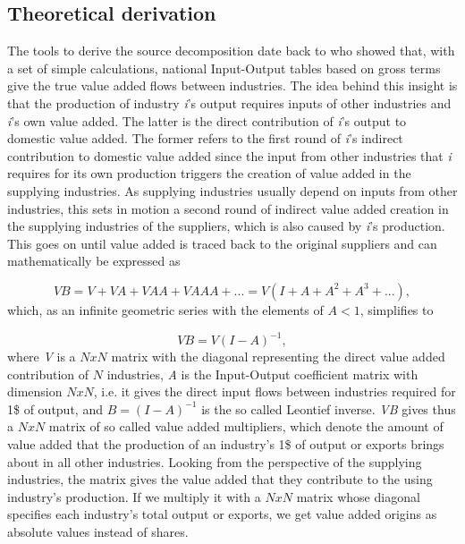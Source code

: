 \documentclass[a4paper]{article}\usepackage[]{graphicx}\usepackage[]{color}
\begin{document}
\subsection{Theoretical derivation}
The tools to derive the source decomposition date back to \citet{wale36} who showed that, with a set of simple calculations, 
national Input-Output tables based on gross terms give the true value added flows between industries. 
The idea behind this insight is that the production of industry \textit{i}'s output requires inputs of other industries 
and \textit{i}'s own value added.
The latter is the direct contribution of \textit{i}'s output to domestic value added. 
The former refers to the first round of \textit{i}'s indirect contribution to domestic value added since the input from 
other industries that \textit{i} requires for its own production triggers the creation of value added in the supplying 
industries.
As supplying industries usually depend on inputs from other industries, this sets in motion a second round 
of indirect value added creation in the supplying industries of the suppliers, which is also caused by \textit{i}'s production. 
This goes on until value added is traced back to the original suppliers and can mathematically be expressed as 

\begin{equation}
VB = V + VA + VAA + VAAA + ... = V (I+A+A^{2}+A^{3}+...),
\end{equation}
which, as an infinite geometric series with the elements of $A<1$, simplifies to

\begin{equation}
VB = V (I-A)^{-1},
\end{equation}
where \textit{V} is a $N x N$ matrix with the diagonal representing the direct value added contribution of $N$ industries,
\textit{A} is the Input-Output coefficient matrix with dimension $N x N$, i.e. it gives the direct input flows between
industries required for 1\$ of output, and $B = (I-A)^{-1}$ is the so called Leontief inverse.
\textit{VB} gives thus a $N x N$ matrix of so called value added multipliers, which denote the amount of value added that the production of an industry's 1\$ of output or exports brings about in all other industries.
Looking from the perspective of the supplying industries, the matrix gives the value added that they contribute to the using industry's production.
If we multiply it with a $N x N$ matrix whose diagonal specifies each industry's total output or exports, we get value added origins as absolute values instead of shares.
\end{document}
